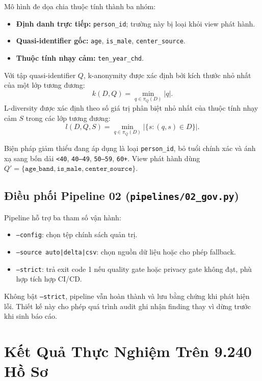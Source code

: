 \documentclass[11pt,a4paper]{article}
\begin{document}
Mô hình đe dọa chia thuộc tính thành ba nhóm:

\begin{itemize}
    \item \textbf{Định danh trực tiếp:} \texttt{person\_id}; trường này bị loại khỏi view phát hành.
    \item \textbf{Quasi-identifier gốc:} \texttt{age}, \texttt{is\_male}, \texttt{center\_source}.
    \item \textbf{Thuộc tính nhạy cảm:} \texttt{ten\_year\_chd}.
\end{itemize}

Với tập quasi-identifier $Q$, k-anonymity được xác định bởi kích thước nhỏ nhất của một lớp tương đương:
\[
k(D,Q)=\min_{q\in\pi_Q(D)}|q|.
\]
L-diversity được xác định theo số giá trị phân biệt nhỏ nhất của thuộc tính nhạy cảm $S$ trong các lớp tương đương:
\[
l(D,Q,S)=\min_{q\in\pi_Q(D)}\left|\{s:(q,s)\in D\}\right|.
\]

Biện pháp giảm thiểu đang áp dụng là loại \texttt{person\_id}, bỏ tuổi chính xác và ánh xạ sang bốn dải \texttt{<40}, \texttt{40--49}, \texttt{50--59}, \texttt{60+}. View phát hành dùng $Q'=\{\texttt{age\_band},\texttt{is\_male},\texttt{center\_source}\}$.

\subsection{Điều phối Pipeline 02 (\texttt{pipelines/02\_gov.py})}

Pipeline hỗ trợ ba tham số vận hành:

\begin{itemize}
    \item \texttt{--config}: chọn tệp chính sách quản trị.
    \item \texttt{--source auto|delta|csv}: chọn nguồn dữ liệu hoặc cho phép fallback.
    \item \texttt{--strict}: trả exit code 1 nếu quality gate hoặc privacy gate không đạt, phù hợp tích hợp CI/CD.
\end{itemize}

Không bật \texttt{--strict}, pipeline vẫn hoàn thành và lưu bằng chứng khi phát hiện lỗi. Thiết kế này cho phép quá trình audit ghi nhận finding thay vì dừng trước khi sinh báo cáo.

\section{Kết Quả Thực Nghiệm Trên 9.240 Hồ Sơ}
\end{document}
